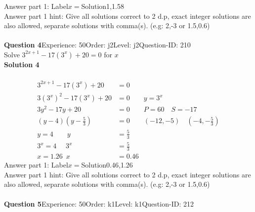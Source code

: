 \documentclass{article}
\begin{document}
Answer part 1: \hspace{10pt}Label\hspace{10pt}$x=$\hspace{10pt}Solution\hspace{10pt}1,1.58\\
Answer part 1 hint: \hspace{15pt} Give all solutions correct to 2 d.p, exact integer solutions are also allowed, separate solutions with comma(s). (e.g: 2,-3 or 1.5,0.6)\\
\\[4pt]
\noindent\textbf{Question 4}\hspace{20pt}Experience: 50\hspace{20pt}Order: j2\hspace{20pt}Level: j2\hspace{20pt}Question-ID: 210\\[2pt]
Solve $3^{2x+1}-17(3^x)+20=0$ for $x$\\[4pt]
\noindent\textbf{Solution 4}\\[2pt]
\\[-35pt]\begin{align*}
3^{2x+1}-17(3^x)+20&=0\\[2pt]
3(3^x)^2-17(3^x)+20&=0\qquad y=3^x\\[2pt]
3y^2-17y+20&=0\qquad P=60 \quad S=-17\\[2pt]
(y-4)\left(y-\displaystyle\frac{5}{3}\right)&=0\qquad (-12,-5)\quad \left(-4,-\displaystyle\frac{5}{3}\right)\\[2pt]
y=4 \qquad y&=\displaystyle\frac{5}{3}\\[2pt]
3^x=4\hspace{16pt} 3^x&=\displaystyle\frac{5}{3}\\[2pt]
x=1.26 \hspace{6pt} x&=0.46
\end{align*}
Answer part 1: \hspace{10pt}Label\hspace{10pt}$x=$\hspace{10pt}Solution\hspace{10pt}0.46,1.26\\
Answer part 1 hint: \hspace{15pt} Give all solutions correct to 2 d.p, exact integer solutions are also allowed, separate solutions with comma(s). (e.g: 2,-3 or 1.5,0.6)\\
\\[4pt]
\noindent\textbf{Question 5}\hspace{20pt}Experience: 50\hspace{20pt}Order: k1\hspace{20pt}Level: k1\hspace{20pt}Question-ID: 212\\[2pt]
\end{document}

